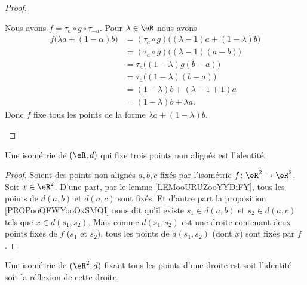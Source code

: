 \begin{proof}
\begin{subproof}
		\spitem[Conclusion]
		Nous avons \( f=\tau_a\circ g\circ \tau_{-a}\). Pour \( \lambda\in \eR\) nous avons
		\begin{subequations}
			\begin{align}
				f\big( \lambda a +(1-\alpha)b \big) & =(\tau_a\circ g)\big( (\lambda-1)a+(1-\lambda)b \big) \\
				                                    & =(\tau_a\circ g)\big( (\lambda-1)(a-b) \big)          \\
				                                    & =\tau_a\big( (1-\lambda)g(b-a) \big)                  \\
				                                    & =\tau_a\big( (1-\lambda)(b-a) \big)                   \\
				                                    & =(1-\lambda)b+(\lambda-1+1)a                          \\
				                                    & =(1-\lambda)b+\lambda a.
			\end{align}
		\end{subequations}
		Donc \( f\) fixe tous les points de la forme \( \lambda a+(1-\lambda)b\).
	\end{subproof}
\end{proof}

\begin{proposition}	\label{PROPooUQHMooHLtmXQ}
	Une isométrie de \( (\eR, d)\) qui fixe trois points non alignés est l'identité.
\end{proposition}

\begin{proof}
	Soient des points non alignés \( a,b,c\) fixés par l'isométrie \(f \colon \eR^2\to \eR^2  \). Soit \( x\in \eR^2\). D'une part, par le lemme \ref{LEMooURUZooYYDiFY}, tous les points de \( d(a,b)\) et \( d(a,c)\) sont fixés. Et d'autre part la proposition \ref{PROPooQFWYooOxSMQI} nous dit qu'il existe \( s_1\in d(a,b)\) et \( s_2\in d(a,c)\) tels que \( x\in d(s_1,s_2)\). Mais comme \( d(s_1,s_2)\) est une droite contenant deux points fixes de \( f\) (\( s_1 \) et \( s_2\)), tous les points de \( d(s_1,s_2)\) (dont \( x\)) sont fixés par \( f\).
\end{proof}


\begin{lemma}		\label{LEMooRVKEooSlIrIR}
	Une isométrie de \( (\eR^2,d)\) fixant tous les points d'une droite est soit l'identité soit la réflexion de cette droite.
\end{lemma}

